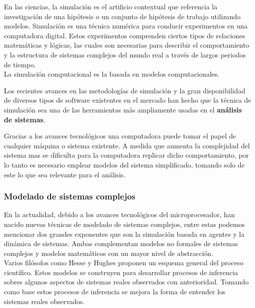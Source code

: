 En las ciencias, la simulación es el artificio contextual que referencia la investigación de una hipótesis o un conjunto de hipótesis de trabajo utilizando modelos.
Simulación es una técnica numérica para conducir experimentos en una computadora digital. Estos experimentos comprenden ciertos tipos de relaciones matemáticas y lógicas, las cuales son necesarias para describir el comportamiento y la estructura de sistemas complejos del mundo real a través de largos periodos de tiempo. \parencite{noauthor_simulacion_nodate}\\

La simulación computacional es la basada en modelos computacionales.

Los recientes avances en las metodologías de simulación y la gran disponibilidad de diversos tipos de software existentes en el mercado han hecho que la técnica de simulación sea una de las herramientas más ampliamente usadas en el \textbf{análisis de sistemas}.

Gracias a los avances tecnológicos una computadora puede tomar el papel de cualquier máquina o sistema existente. A medida que aumenta la complejidad del sistema mas se dificulta para la computadora replicar dicho comportamiento, por lo tanto es necesario emplear modelos del sistema simplificado, tomando solo de este lo que sea relevante para el análisis.

\subsubsection{Modelado de sistemas complejos}

En la actualidad, debido a los avances tecnológicos del microprocesador, han nacido nuevas técnicas de modelado de sistemas complejos, entre estas podemos mencionar dos grandes exponentes que son la simulación basada en agentes y la dinámica de sistemas. Ambas complementan modelos no formales de sistemas complejos y modelos matemáticos con un mayor nivel de abstracción.\\

Varios filósofos como Hesse \parencite{echenique1970models} y Hughes \parencite{hughes1997models} proponen un esquema general del proceso científico. Estos modelos se construyen para desarrollar procesos de inferencia sobres algunos aspectos de sistemas reales observados con anterioridad. Tomando como base estos procesos de inferencia se mejora la forma de entender los sistemas reales observados. \parencite{izquierdo2008modelado}

